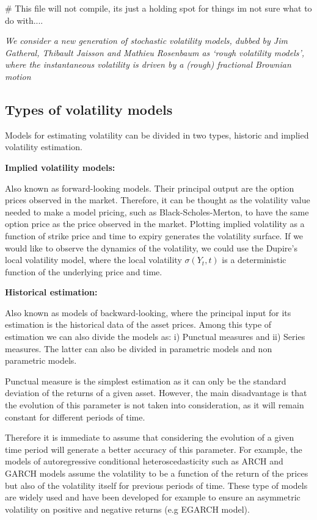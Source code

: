 # This file will not compile, its just a holding spot for things im not sure what to do with....


\emph{We consider a new generation of stochastic volatility models, dubbed by Jim Gatheral, Thibault Jaisson and Mathieu Rosenbaum as `rough volatility models’, where the instantaneous volatility is driven by a (rough) fractional Brownian motion} %


\subsection{Types of volatility models}
Models for estimating volatility can be divided in two types, historic and implied volatility estimation.

\textbf{Implied volatility models:}

Also known as forward-looking models. Their principal output are the option prices observed in the market. Therefore, it can be thought as the volatility value needed to make a model pricing, such as Black-Scholes-Merton, to have the same option price as the price observed in the market. Plotting implied volatility as a function of strike price and time to expiry generates the volatility surface. If we would like to observe the dynamics of the volatility, we could use the Dupire’s local volatility model, where the local volatility $\sigma(Y_{t}, t)$ is a deterministic function of the underlying price and time.  

\textbf{Historical estimation:} 

Also known as models of backward-looking, where the principal input for its estimation is the historical data of the asset prices. Among this type of estimation we can also divide the models as: i) Punctual measures and ii) Series measures. The latter can also be divided in parametric models and non parametric models.
 
Punctual measure is the simplest estimation as it can only be the standard deviation of the returns of a given asset. However, the main disadvantage is that the evolution of this parameter is not taken into consideration, as it will remain constant for different periods of time. 

Therefore it is immediate to assume that considering the evolution of a given time period will generate a better accuracy of this parameter. For example, the models of autoregressive conditional heteroscedasticity such as ARCH and GARCH models assume the volatility to be a function of the return of the prices but also of the volatility itself for previous periods of time. These type of models are widely used and have been developed for example to ensure an asymmetric volatility on positive and negative returns (e.g EGARCH model).

